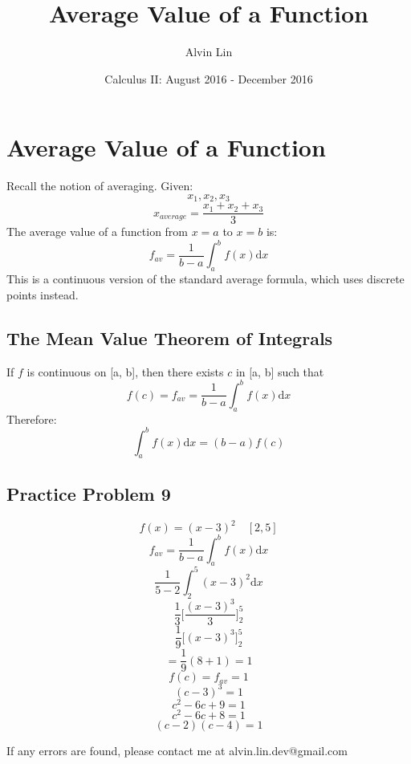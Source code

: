 \documentclass[letterpaper, 12pt]{article}
\title{Average Value of a Function}
\author{Alvin Lin}
\date{Calculus II: August 2016 - December 2016}
\newcommand*{\diff}{\mathrm{d}}
\begin{document}
\maketitle

\section*{Average Value of a Function}
Recall the notion of averaging. Given:
\[ x_{1}, x_{2}, x_{3} \]
\[ x_{average} = \frac{x_{1}+x_{2}+x_{3}}{3} \]
The average value of a function from \( x = a \) to \( x = b \) is:
\[ f_{av} = \frac{1}{b-a}\int_{a}^{b}{f(x)\diff{x}} \]
This is a continuous version of the standard average formula, which uses
discrete points instead.

\subsection*{The Mean Value Theorem of Integrals}
If \( f \) is continuous on [a, b], then there exists \( c \) in [a, b] such
that
\[ f(c) = f_{av} = \frac{1}{b-a}\int_{a}^{b}{f(x)\diff{x}} \]
Therefore:
\[ \int_{a}^{b}{f(x)\diff{x}} = (b-a)f(c) \]

\subsection*{Practice Problem 9}
\[ f(x) = (x-3)^{2} \quad [2, 5] \]
\[ f_{av} = \frac{1}{b-a}\int_{a}^{b}{f(x)\diff{x}} \]
\[ \frac{1}{5-2}\int_{2}^{5}{(x-3)^{2}\diff{x}} \]
\[ \frac{1}{3}\bigg[\frac{(x-3)^{3}}{3}\bigg]_{2}^{5} \]
\[ \frac{1}{9}\bigg[(x-3)^{3}]_{2}^{5} \]
\[ = \frac{1}{9}(8+1) = 1 \]
\[ f(c) = f_{av} = 1 \]
\[ (c-3)^{3} = 1 \]
\[ c^{2}-6c+9 = 1 \]
\[ c^{2}-6c+8 = 1 \]
\[ (c-2)(c-4) = 1 \]

\begin{center}
  If any errors are found, please contact me at alvin.lin.dev@gmail.com
\end{center}
\end{document}
